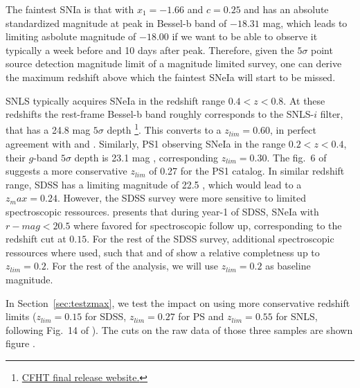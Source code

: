 \documentclass[]{aa} %
\newcommand{\mr}[1]{{\textcolor[rgb]{0.60,0.10,0.6}{#1}}}
\begin{document}
The faintest SNIa is that with $x_1=-1.66$ and $c=0.25$ and has an absolute \mr{standardized} magnitude at peak \mr{in Bessel-b band} of $-18.31$ mag, which leads to limiting asbolute magnitude of
$-18.00$ if we want to be able to observe it typically a week before and 10 days after peak.  
Therefore, given the $5\sigma$ point source detection magnitude
limit of a magnitude limited survey, one can derive the maximum redshift above which the faintest SNeIa will start to be missed. 

\mr{SNLS typically acquires SNeIa in the redshift range $0.4<z<0.8$. At these redshifts the rest-frame Bessel-b band roughly corresponds to the SNLS-$i$ filter, that has a 24.8 mag $5\sigma$ depth \footnote{\href{https://www.cfht.hawaii.edu/Science/CFHTLS/cfhtlsfinalreleaseexecsummary.html}{CFHT final release website.}}. This converts to a $z_{lim}=0.60$, in perfect agreement with \citep{neill2006} and \citep{perrett2010}.
Similarly, PS1 observing SNeIa in the range $0.2<z<0.4$, their $g$-band $5\sigma$ depth is 23.1 mag \citep{rest2014}, corresponding $z_{lim}=0.30$.
The fig.~6 of \citep{scolnic2018} suggests a more conservative $z_{lim}$ of 0.27 for the PS1 catalog. In similar redshift range, SDSS has a limiting magnitude of 22.5 \citep{dilday2008,sake2008,sako2014}, which would lead to a $z_max=0.24$. However, the SDSS survey were more sensitive to limited spectroscopic ressources. \cite{kessler2009} presents that during year-1 of SDSS, SNeIa with $r-mag<20.5$ where favored for spectroscopic follow up, corresponding to the redshift cut at $0.15$. For the rest of the SDSS survey, additional spectroscopic ressources where used, such that \cite{kessler2009} and  \cite{dilday2008} of show a relative completness up to $z_{lim}=0.2$. For the rest of the analysis, we will use $z_{lim}=0.2$ as baseline magnitude.}

\mr{In Section~\ref{sec:testzmax}, we test the impact on using more conservative redshift limits ($z_{lim}=0.15$ for SDSS, $z_{lim}=0.27$ for PS and $z_{lim}=0.55$ for SNLS, following Fig.~14 of \citealt{perrett2010}).} The cuts on the raw data of those three samples are shown figure .
\end{document}
